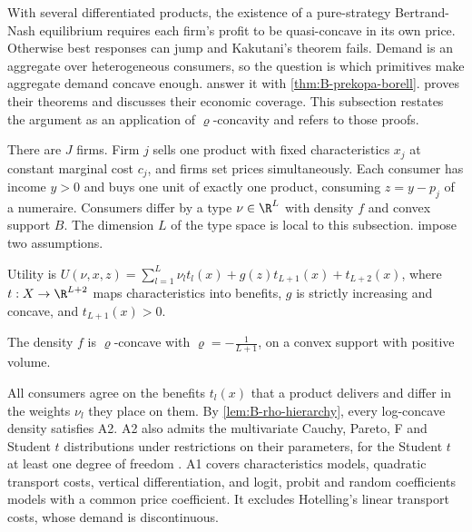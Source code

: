 With several differentiated products, the existence of a pure-strategy Bertrand-Nash equilibrium requires each
firm's profit to be quasi-concave in its own price. Otherwise best responses can jump and Kakutani's theorem
fails. Demand is an aggregate over heterogeneous consumers, so the question is which primitives make aggregate
demand concave enough. \citet{CaplinNalebuff1991} answer it with \cref{thm:B-prekopa-borell}. 
proves their theorems and discusses their economic coverage. This subsection restates the argument as an
application of $\varrho$-concavity and refers to those proofs.

There are $J$ firms. Firm $j$ sells one product with fixed characteristics $x_j$ at constant marginal cost
$c_j$, and firms set prices simultaneously. Each consumer has income $y > 0$ and buys one unit of exactly one
product, consuming $z = y - p_j$ of a numeraire. Consumers differ by a type $\nu \in \R^L$ with density $f$ and
convex support $B$. The dimension $L$ of the type space is local to this subsection. \citet{CaplinNalebuff1991}
impose two assumptions.

\begin{assumption}\label{ass:B-cn-a1}
Utility is $U(\nu, x, z) = \sum_{l=1}^L \nu_l t_l(x) + g(z)t_{L+1}(x) + t_{L+2}(x)$, where $t : X \to \R^{L+2}$ maps
characteristics into benefits, $g$ is strictly increasing and concave, and $t_{L+1}(x) > 0$.
\end{assumption}

\begin{assumption}\label{ass:B-cn-a2}
The density $f$ is $\varrho$-concave with $\varrho = -\frac{1}{L + 1}$, on a convex support with positive volume.
\end{assumption}

All consumers agree on the benefits $t_l(x)$ that a product delivers and differ in the weights $\nu_l$ they place on
them. By \cref{lem:B-rho-hierarchy}, every log-concave density satisfies A2. A2 also admits the multivariate
Cauchy, Pareto, F and Student $t$ distributions under restrictions on their parameters, for the Student $t$ at
least one degree of freedom \citep[Section 3, p.~6]{CaplinNalebuff1991}. A1 covers
characteristics models, quadratic transport costs, vertical differentiation, and logit, probit and random
coefficients models with a common price coefficient. It excludes Hotelling's linear transport costs, whose
demand is discontinuous.

